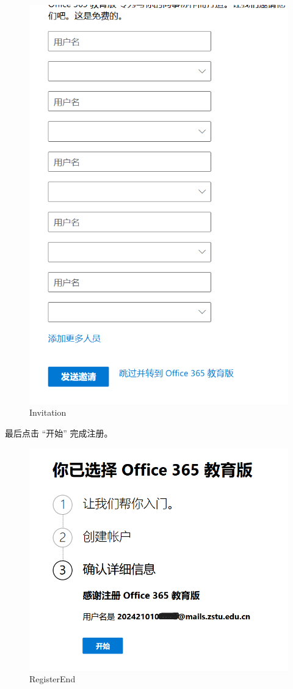 \documentclass[]{ctexbook}
\theoremstyle{definition}
\theoremstyle{definition}
\theoremstyle{definition}
\theoremstyle{definition}
\theoremstyle{remark}
\begin{document}
\begin{figure}

{\centering \includegraphics[width=0.8\linewidth]{img/OneDrive/Invitation} 

}

\caption{Invitation}\label{fig:OneDrive-Invitation}
\end{figure}

最后点击 ``开始'' 完成注册。

\begin{figure}

{\centering \includegraphics[width=0.8\linewidth]{img/OneDrive/RegisterEnd} 

}

\caption{RegisterEnd}\label{fig:OneDrive-RegisterEnd}
\end{figure}
\end{document}
